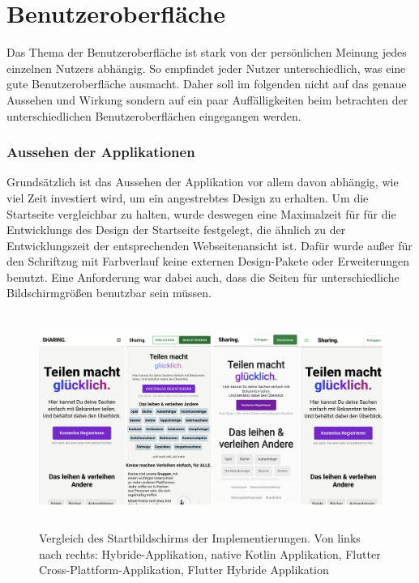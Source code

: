 \section{Benutzeroberfläche}
Das Thema der Benutzeroberfläche ist stark von der persönlichen Meinung jedes einzelnen Nutzers abhängig. So empfindet jeder Nutzer unterschiedlich, was eine gute Benutzeroberfläche ausmacht. Daher soll im folgenden nicht auf das genaue Aussehen und Wirkung sondern auf ein paar Auffälligkeiten beim betrachten der unterschiedlichen Benutzeroberflächen eingegangen werden.

\subsubsection{Aussehen der Applikationen}
Grundsätzlich ist das Aussehen der Applikation vor allem davon abhängig, wie viel Zeit investiert wird, um ein angestrebtes Design zu erhalten. Um die Startseite vergleichbar zu halten, wurde deswegen eine Maximalzeit für für die Entwicklungs des Design der Startseite festgelegt, die ähnlich zu der Entwicklungszeit der entsprechenden Webseitenansicht ist. Dafür wurde außer für den Schriftzug mit Farbverlauf keine externen Design-Pakete oder Erweiterungen benutzt. Eine Anforderung war dabei auch, dass die Seiten für unterschiedliche Bildschirmgrößen benutzbar sein müssen.

\begin{figure}[ht]
  \centering
  \includegraphics[height=7cm,keepaspectratio]{images/Startbildschirm_vergleich.png} 
  \caption[Vergleich des Startbildschirms der Implementierungen]{Vergleich des Startbildschirms der Implementierungen. Von links nach rechts: Hybride-Applikation, native Kotlin Applikation, Flutter Cross-Plattform-Applikation, Flutter Hybride Applikation}
  \label{fig:startscreen}
\end{figure}

